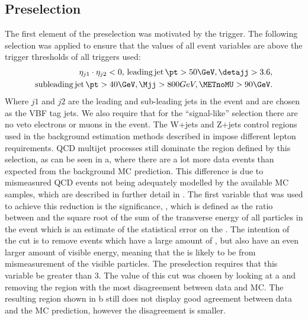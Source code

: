 \subsection{Preselection}
\label{sec:parkedpresel}
The first element of the preselection was motivated by the trigger. The following selection was applied to ensure that the values of all event variables are above the trigger thresholds of all triggers used:
\begin{align}
  \label{eq:parkedprepresel}
  \begin{split}
  \eta_{j1}\cdot\eta_{j2}<0,\,\mathrm{leading\,jet\,}\pt>50 \GeV, \detajj>3.6, \\
  \mathrm{subleading\,jet\,}\pt>40 \GeV, \Mjj>800 GeV, \METnoMU>90\GeV.
  \end{split}
\end{align}
Where $j1$ and $j2$ are the leading and sub-leading \pt jets in the event and are chosen as the \ac{VBF} tag jets. We also require that for the ``signal-like'' selection there are no veto electrons or muons in the event. The W+jets and Z+jets control regions used in the background estimation methods described in  impose different lepton requirements. QCD multijet processes still dominate the region defined by this selection, as can be seen in a, where there are a lot more data events than expected from the background \ac{MC} prediction. This difference is due to mismeasured \ac{QCD} events not being adequately modelled by the available \ac{MC} samples, which are described in further detail in . The first variable that was used to achieve this reduction is the \MET significance, \METsig, which is defined as the ratio between \METnoMU and the square root of the sum of the transverse energy of all particles in the event which is an estimate of the statistical error on the \MET. The intention of the \METsig cut is to remove events which have a large amount of \MET, but also have an even larger amount of visible energy, meaning that the \MET is likely to be from mismeasurement of the visible particles. The preselection requires that this variable be greater than 3. The value of this cut was chosen by looking at a and removing the region with the most disagreement between data and \ac{MC}. The resulting region shown in b still does not display good agreement between data and the \ac{MC} prediction, however the disagreement is smaller.

